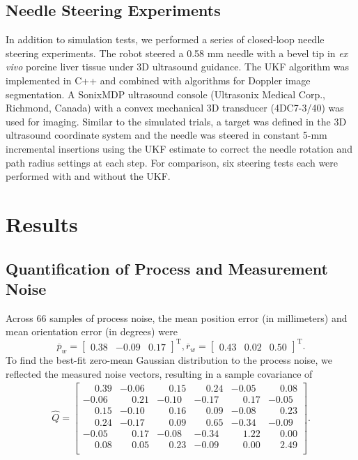 \subsection{Needle Steering Experiments}
In addition to simulation tests, we performed a series of closed-loop needle steering experiments. The robot steered a 0.58 mm needle with a bevel tip in \textit{ex vivo} porcine liver tissue under 3D ultrasound guidance. The UKF algorithm was implemented in C++ and combined with algorithms for Doppler image segmentation. A SonixMDP ultrasound console (Ultrasonix Medical Corp., Richmond, Canada) with a convex mechanical 3D transducer (4DC7-3/40) was used for imaging. Similar to the simulated trials, a target was defined in the 3D ultrasound coordinate system and the needle was steered in constant 5-mm incremental insertions using the UKF estimate to correct the needle rotation and path radius settings at each step. For comparison, six steering tests each were performed with and without the UKF.

\section{Results}
\subsection{Quantification of Process and Measurement Noise}
Across 66 samples of process noise, the mean position error (in millimeters) and mean orientation error (in degrees) were \[{\overline{p}_{w}} = \begin{bmatrix} 0.38 &-0.09 &0.17 \end{bmatrix}^{\text{T}}, {\overline{r}_{w}} = \begin{bmatrix} 0.43 &0.02 &0.50 \end{bmatrix}^{\text{T}}.\] To find the best-fit zero-mean Gaussian distribution to the process noise, we reflected the measured noise vectors, resulting in a sample covariance of
\begin{align*}
{\hat{Q}} = \begin{bmatrix} 
\phantom{-}0.39 	& -0.06 	& \phantom{-}0.15 		& \phantom{-}0.24 		& -0.05 	& \phantom{-}0.08\\ 
-0.06 			& \phantom{-}0.21  	& -0.10   	& -0.17 	& \phantom{-}0.17 		& -0.05\\
\phantom{-}0.15 	& -0.10 	& \phantom{-}0.16    	& \phantom{-}0.09 		& -0.08 	& \phantom{-}0.23\\
\phantom{-}0.24 	& -0.17 	& \phantom{-}0.09  	& \phantom{-}0.65 		& -0.34 	& -0.09\\
-0.05 	& \phantom{-}0.17		& -0.08 	& -0.34 	& \phantom{-}1.22		& \phantom{-}0.00\\
\phantom{-}0.08 	& \phantom{-}0.05		& \phantom{-}0.23  	& -0.09 	& \phantom{-}0.00 	& \phantom{-}2.49\\
\end{bmatrix}.
\end{align*}


